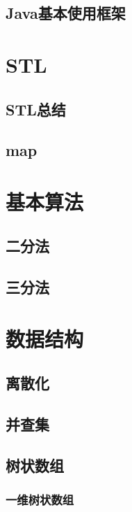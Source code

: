 \documentclass[a4paper, 12pt]{article}
\begin{document}
\subsection{Java基本使用框架}


\section{STL}
\subsection{STL总结}

\subsection{map}


\section{基本算法}
\subsection{二分法}

\subsection{三分法}


\section{数据结构}
\subsection{离散化}

\subsection{并查集}


\subsection{树状数组}
\subsubsection{一维树状数组}

\end{document}
